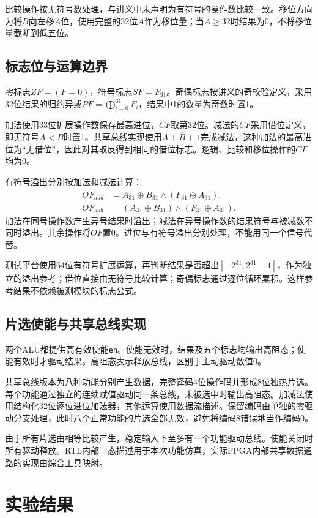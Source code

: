 \documentclass[12pt,a4paper]{ctexart}
\begin{document}
比较操作按无符号数处理，与讲义中未声明为有符号的操作数比较一致。移位方向为将$B$向左移$A$位，使用完整的32位$A$作为移位量；当$A\geq32$时结果为0，不将移位量截断到低五位。

\subsection{标志位与运算边界}
零标志$ZF=(F=0)$，符号标志$SF=F_{31}$。奇偶标志按讲义的奇校验定义，采用32位结果的归约异或$PF=\bigoplus_{i=0}^{31}F_i$，结果中1的数量为奇数时置1。

加法使用33位扩展操作数保存最高进位，$CF$取第32位。减法的$CF$采用借位定义，即无符号$A<B$时置1。共享总线实现使用$A+\overline B+1$完成减法，这种加法的最高进位为“无借位”，因此对其取反得到相同的借位标志。逻辑、比较和移位操作的$CF$均为0。

有符号溢出分别按加法和减法计算：
\begin{align}
OF_{add}&=\overline{A_{31}\oplus B_{31}}\land(F_{31}\oplus A_{31}),\\
OF_{sub}&=(A_{31}\oplus B_{31})\land(F_{31}\oplus A_{31}).
\end{align}
加法在同号操作数产生异号结果时溢出；减法在异号操作数的结果符号与被减数不同时溢出。其余操作将$OF$置0。进位与有符号溢出分别处理，不能用同一个信号代替。

测试平台使用64位有符号扩展运算，再判断结果是否超出$[-2^{31},2^{31}-1]$，作为独立的溢出参考；借位直接由无符号比较计算；奇偶标志通过逐位循环累积。这样参考结果不依赖被测模块的标志公式。

\subsection{片选使能与共享总线实现}
两个ALU都提供高有效使能\texttt{en}。使能无效时，结果及五个标志均输出高阻态；使能有效时才驱动结果。高阻态表示释放总线，区别于主动驱动数值0。

共享总线版本为八种功能分别产生数据，完整译码4位操作码并形成8位独热片选。每个功能通过独立的连续赋值驱动同一条总线，未被选中时输出高阻态。加减法使用结构化32位逐位进位加法器，其他运算使用数据流描述。保留编码由单独的零驱动分支处理，此时八个正常功能的片选全部无效，避免将编码8错误地当作编码0。

由于所有片选由相等比较产生，稳定输入下至多有一个功能驱动总线。使能关闭时所有驱动释放。RTL内部三态描述用于本次功能仿真，实际FPGA内部共享数据通路的实现由综合工具映射。

\section{实验结果}
\end{document}

